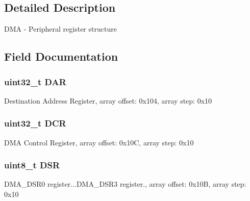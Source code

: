 \subsection{Detailed Description}
D\+M\+A -\/ Peripheral register structure 

\subsection{Field Documentation}
\hypertarget{struct_d_m_a___mem_map_ab409d052e7a184d36b412e665a1e079a}{}
\subsubsection[{D\+A\+R}]{\setlength{\rightskip}{0pt plus 5cm}uint32\+\_\+t D\+A\+R}\label{struct_d_m_a___mem_map_ab409d052e7a184d36b412e665a1e079a}
Destination Address Register, array offset\+: 0x104, array step\+: 0x10 \hypertarget{struct_d_m_a___mem_map_a86826ed1a54abd232a0ce7a4bc81201b}{}
\subsubsection[{D\+C\+R}]{\setlength{\rightskip}{0pt plus 5cm}uint32\+\_\+t D\+C\+R}\label{struct_d_m_a___mem_map_a86826ed1a54abd232a0ce7a4bc81201b}
D\+M\+A Control Register, array offset\+: 0x10\+C, array step\+: 0x10 \hypertarget{struct_d_m_a___mem_map_af59ac6c373e8107836aab76df475a6cd}{}
\subsubsection[{D\+S\+R}]{\setlength{\rightskip}{0pt plus 5cm}uint8\+\_\+t D\+S\+R}\label{struct_d_m_a___mem_map_af59ac6c373e8107836aab76df475a6cd}
D\+M\+A\+\_\+\+D\+S\+R0 register...D\+M\+A\+\_\+\+D\+S\+R3 register., array offset\+: 0x10\+B, array step\+: 0x10 \hypertarget{struct_d_m_a___mem_map_ae7642b2f08448a1bd463111a464f8e46}{}
